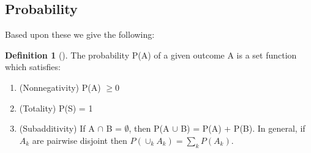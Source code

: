 \documentclass[10pt,]{book}
\theoremstyle{plain}
\theoremstyle{definition}
\newtheorem{definition}[theorem]{Definition}
\theoremstyle{definition}
\theoremstyle{definition}
\numberwithin{equation}{section}
\begin{document}
\subsection[{Probability}]{Probability}\label{subsection-3}
Based upon these we give the following:%
\begin{definition}[{}]\label{DefnProb}
The probability P(A) of a given outcome A is a set function which satisfies:
			\leavevmode%
\begin{enumerate}
\item\hypertarget{li-109}{}(Nonnegativity) P(A) \(\ge 0\)%
\item\hypertarget{li-110}{}(Totality) P(S) = 1%
\item\hypertarget{li-111}{}(Subadditivity) If A \(\cap\) B = \(\emptyset\), then P(A \(\cup\) B) = P(A) + P(B).  
				In general, if {\(A_k\)} are pairwise disjoint then \(P( \cup_k A_k) = \sum_k P(A_k)\).%
\end{enumerate}
\end{definition}
\typeout{************************************************}
\typeout{************************************************}
\end{document}
